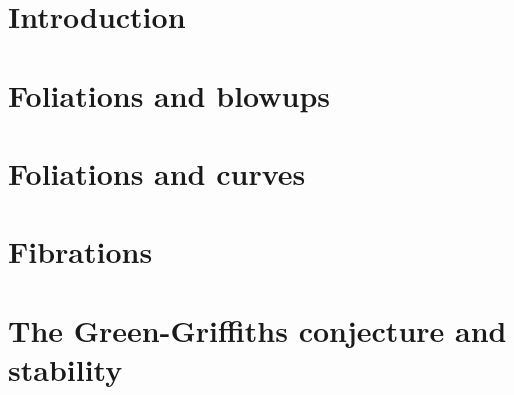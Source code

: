 
\section{Introduction}



\section{Foliations and blowups}



\section{Foliations and curves}



\section{Fibrations}



\section{The Green-Griffiths conjecture and stability}\label{sec:stability}


